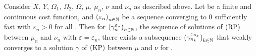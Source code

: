 \begin{theorem}\label{RelatRegSolOrigSolPlan}
	Consider $X$, $Y$, $\Omega_1$, $\Omega_2$, $\Omega$, $\mu$, $\mu_n$, $\nu$ and $\nu_n$ as described above. Let \map[c]{\Omega}{\RZero} be a finite and continuous cost function, and ${(\varepsilon_n)}_{\NinN}$ be a sequence converging to $0$ sufficiently fast with $\varepsilon_n > 0$ for all \NinN. Then for ${(\gamma_n^{\varepsilon_n})}_{\NinN}$, the sequence of solutions of$\text{\normalfont\ (RP)}$ between $\mu_n$ and $\nu_n$ with $\varepsilon = \varepsilon_n$, there exists a subsequence ${(\gamma_{n_k}^{\varepsilon_{n_k}})}_{\NinN[k]}$ that weakly converges to a solution $\gamma$ of$\text{\normalfont\ (KP)}$ between $\mu$ and $\nu$ for \Ninf.
\end{theorem}

